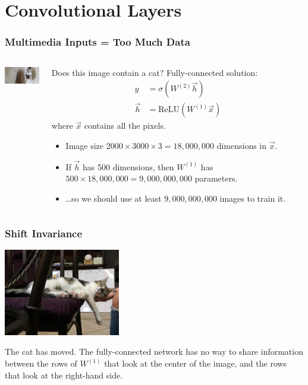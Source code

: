 \documentclass{beamer}
\begin{document}
\section{Convolutional Layers}
\setcounter{subsection}{1}

\begin{frame}
  \frametitle{Multimedia Inputs = Too Much Data}
  \begin{columns}[t]
    \column{1in}
    \begin{block}{}
      \centerline{\includegraphics[width=0.8in]{figs/kitten.jpg}}
    \end{block}
    \column{3.5in}
    \begin{block}{Does this image contain a  cat?}
      Fully-connected solution:
      \begin{align*}
        \hat{y} &=\sigma\left(W^{(2)}\vec{h}\right)\\
        \vec{h} &= \mbox{ReLU}\left(W^{(1)}\vec{x}\right)
      \end{align*}
      where $\vec{x}$ contains all the pixels.
      \begin{itemize}
      \item Image size $2000\times 3000\times 3=18,000,000$ dimensions in $\vec{x}$.
      \item If $\vec{h}$ has 500 dimensions, then $W^{(1)}$ has
        $500\times 18,000,000=9,000,000,000$ parameters.
      \item \ldots so we should use at least $9,000,000,000$ images to train it.
      \end{itemize}
    \end{block}
  \end{columns}
\end{frame}

\begin{frame}
  \frametitle{Shift Invariance}
  \centerline{\includegraphics[height=1.5in]{figs/IMG-20200826-WA0000.jpg}}
    The cat has moved.  The fully-connected network has no way to
    share information between the rows of $W^{(1)}$ that look at the
    center of the image, and the rows that look at the right-hand side.
\end{frame}
\end{document}
